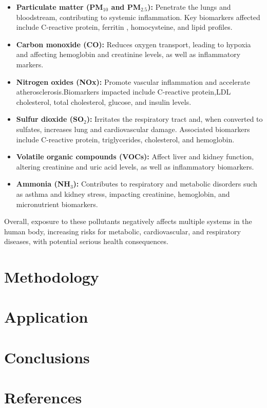 \documentclass[twocolumn]{article}
\begin{document}
\begin{itemize}
    \item \textbf{Particulate matter (PM$_{10}$ and PM$_{2.5}$):} Penetrate the lungs and bloodstream, contributing to systemic inflammation. Key biomarkers affected include C-reactive protein, ferritin , homocysteine, and lipid profiles.
    
    \item \textbf{Carbon monoxide (CO):} Reduces oxygen transport, leading to hypoxia and affecting hemoglobin  and creatinine levels, as well as inflammatory markers.
    
    \item \textbf{Nitrogen oxides (NOx):} Promote vascular inflammation and accelerate atherosclerosis.Biomarkers impacted include C-reactive protein,LDL cholesterol, total cholesterol, glucose, and insulin levels.
    
    \item \textbf{Sulfur dioxide (SO$_2$):} Irritates the respiratory tract and, when converted to sulfates, increases lung and cardiovascular damage. Associated biomarkers include C-reactive protein, triglycerides, cholesterol, and hemoglobin.
    
    \item \textbf{Volatile organic compounds (VOCs):} Affect liver and kidney function, altering creatinine and uric acid levels, as well as inflammatory biomarkers.
    
    \item \textbf{Ammonia (NH$_3$):} Contributes to respiratory and metabolic disorders such as asthma and kidney stress, impacting creatinine, hemoglobin, and micronutrient biomarkers.
\end{itemize}

Overall, exposure to these pollutants negatively affects multiple systems in the human body, increasing risks for metabolic, cardiovascular, and respiratory diseases, with potential serious health consequences.



\section{Methodology}



\section{Application}


\section{Conclusions}


\section{References}
\begin{thebibliography}{9}
\setlength{\itemsep}{0pt}
\setlength{\parskip}{0pt}




\end{thebibliography}
\end{document}

